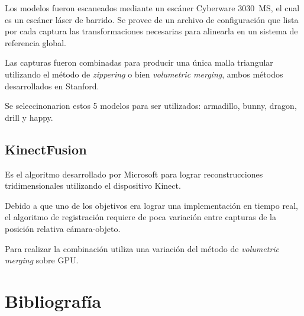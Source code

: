 \documentclass{pfc}
\begin{document}
			Los modelos fueron escaneados mediante un escáner Cyberware 3030~MS,
			el cual es un escáner láser de barrido.
			Se provee de un archivo de configuración que lista por cada captura
			las transformaciones necesarias para alinearla en un sistema de
			referencia global.

			Las capturas fueron combinadas para producir una única malla
			triangular utilizando el método de \emph{zippering} o bien
			\emph{volumetric merging}, ambos métodos desarrollados en Stanford.


			Se seleccinonarion estos 5 modelos para ser utilizados: armadillo, bunny, dragon, drill y happy.

		\subsection{KinectFusion}
			Es el algoritmo desarrollado por Microsoft para lograr reconstrucciones tridimensionales utilizando el dispositivo Kinect.

			Debido a que uno de los objetivos era lograr
			una implementación en tiempo real,
			el algoritmo de registración requiere de
			poca variación entre capturas de
			la posición relativa cámara-objeto.

			Para realizar la combinación utiliza una variación del método de
			\emph{volumetric merging} sobre GPU.

\section{Bibliografía}
\end{document}
